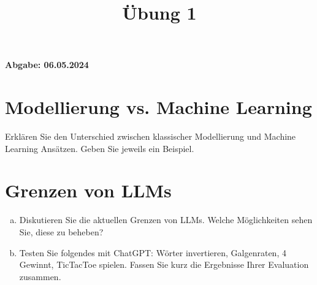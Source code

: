 \documentclass[12pt,ngerman]{AssignmentClass}
\title{Übung 1} %
\begin{document}
	\maketitle

    \noindent %
    \begin{tcolorbox}[colback=gray!20, %
                      colframe=gray!20, %
                      boxrule=0pt, %
                      sharp corners, %
                      valign=center, %
                      halign=center, %
                      height=2cm] %
    \LARGE \bfseries Abgabe: 06.05.2024 %
    \end{tcolorbox}

    
    \section{Modellierung vs. Machine Learning}
        Erklären Sie den Unterschied zwischen klassischer Modellierung und Machine Learning Ansätzen. Geben Sie jeweils ein Beispiel.
        


    
    
    \section{Grenzen von LLMs}
        
        \begin{enumerate}[a)]
        \item Diskutieren Sie die aktuellen Grenzen von LLMs. Welche Möglichkeiten sehen Sie, diese zu beheben?
        

        \item Testen Sie folgendes mit ChatGPT: Wörter invertieren, Galgenraten, 4 Gewinnt, TicTacToe spielen. Fassen Sie kurz die Ergebnisse Ihrer Evaluation zusammen.
        \end{enumerate}
\end{document}
